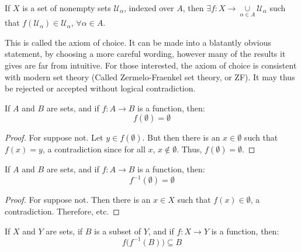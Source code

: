 \documentclass[crop=false,class=book,oneside]{standalone}
\begin{document}
        \begin{axiom}
        If $X$ is a set of nonempty sets $\mathcal{U}_{\alpha}$, indexed over $A$, then $\exists f:X\rightarrow \underset{\alpha \in A}\cup \mathcal{U}_{\alpha}$ such that $f(\mathcal{U}_{\alpha}) \in \mathcal{U}_{\alpha}$, $\forall \alpha\in A$.
        \end{axiom}
        This is called the axiom of choice. It can be made into a blatantly
        obvious statement, by choosing a more careful wording,
        however many of the results it gives are far from intuitive.
        For those interested, the axiom of choice is consistent with
        modern set theory (Called Zermelo-Fraenkel set theory, or ZF).
        It may thus be rejected or accepted without logical contradiction.
        \begin{theorem}
            If $A$ and $B$ are sets, and if $f:A\rightarrow{B}$ is a function, then:
            \begin{equation}
                f(\emptyset)=\emptyset
            \end{equation}
        \end{theorem}
        \begin{proof}
            For suppose not. Let $y\in{f}(\emptyset)$. But then there is an
            $x\in\emptyset$ such that $f(x)=y$, a contradiction since for all
            $x$, $x\notin\emptyset$. Thus, $f(\emptyset)=\emptyset$.
        \end{proof}
        \begin{theorem}
            If $A$ and $B$ are sets, and if $f:A\rightarrow{B}$ is a function, then:
            \begin{equation}
                f^{-1}(\emptyset)=\emptyset
            \end{equation}
        \end{theorem}
        \begin{proof}
            For suppose not. Then there is an $x\in{X}$ such that
            $f(x)\in\emptyset$, a contradiction. Therefore, etc.
        \end{proof}
        \begin{theorem}
            If $X$ and $Y$ are sets, if $B$ is a subset of $Y$,
            and if $f:X\rightarrow{Y}$ is a function, then:
            \begin{equation}
                f\big(f^{-1}(B)\big)\subseteq{B}
            \end{equation}
        \end{theorem}
\end{document}
